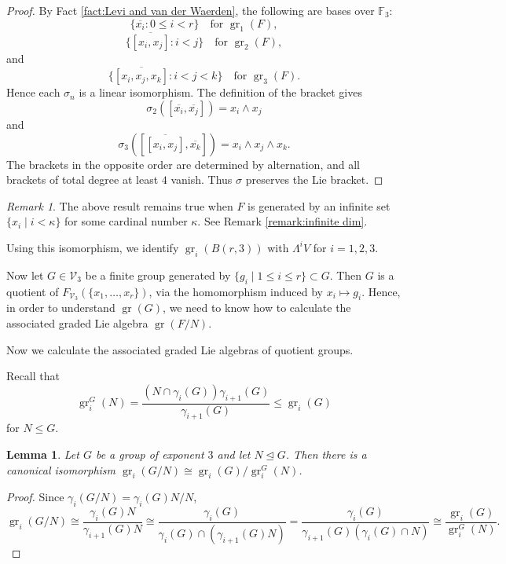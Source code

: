 \documentclass[11pt,reqno]{article}
\newtheorem{lemma}[theorem]{Lemma}
\theoremstyle{definition}
\theoremstyle{remark}
\newtheorem{remark}[theorem]{Remark}
\DeclareMathOperator{\gr}{gr}
\begin{document}
\begin{proof}
    By Fact \ref{fact:Levi and van der Waerden}, the following are bases over
    $\mathbb F_3$:
    $$
    \{\overline{x_i}:0\leq i<r\}\quad\text{for }\gr_1(F),
    $$
    \[
    \{\overline{[x_i,x_j]}:i<j\}\quad\text{for }\gr_2(F),
    \]
    and
    \[
    \{\overline{[x_i,x_j,x_k]}:i<j<k\}\quad\text{for }\gr_3(F).
    \]
    Hence each $\sigma_n$ is a linear isomorphism.  The definition of the
    bracket gives
    \[
    \sigma_2([\overline{x_i},\overline{x_j}])=x_i\wedge x_j
    \]
    and
    \[
    \sigma_3([\overline{[x_i,x_j]},\overline{x_k}])
    =x_i\wedge x_j\wedge x_k.
    \]
    The brackets in the opposite order are determined by alternation, and all
    brackets of total degree at least $4$ vanish.  Thus $\sigma$ preserves the
    Lie bracket.
\end{proof}

\begin{remark}
The above result remains true when $F$ is generated by an infinite set $\{x_i\mid i< \kappa\}$ for some cardinal number $\kappa$. See Remark \ref{remark:infinite dim}. 
\end{remark}

Using this isomorphism, we identify $\gr_i(B(r,3))$ with $\Lambda^iV$ for
$i=1,2,3$.


Now let $G\in \mathcal V_3$ be a finite group generated by $\{g_i\mid 1\leq i\leq r\}\subset G$.
Then $G$ is a quotient of $F_{\mathcal V_3}(\{x_1,\ldots,x_r\})$, via the
homomorphism induced by $x_i\mapsto g_i$.
Hence, in order to understand $\gr(G)$, we need to know how to calculate the associated graded Lie algebra $\gr(F/N)$.

Now we calculate the associated graded Lie algebras of quotient groups.


Recall that
\[
\gr_i^G(N)
=\frac{(N\cap\gamma_i(G))\gamma_{i+1}(G)}{\gamma_{i+1}(G)}
\leq\gr_i(G)
\]
for $N\leq G$.
\begin{lemma}\label{lemma:gr of quotient}
    Let $G$ be a group of exponent $3$ and let $N\trianglelefteq G$.
    Then there is a canonical isomorphism $\gr_i(G/N)\cong \gr_i(G)/\gr_i^G(N)$.
\end{lemma}

\begin{proof}
    Since $\gamma_i(G/N)=\gamma_i(G)N/N$, 
    \[
    \gr_i(G/N)
    \cong
    \frac{\gamma_i(G)N}{\gamma_{i+1}(G)N}
    \cong
    \frac{\gamma_i(G)}{\gamma_{i}(G)\cap(\gamma_{i+1}(G)N)}
    =
    \frac{\gamma_i(G)}{\gamma_{i+1}(G)(\gamma_i(G)\cap N)}
    \cong
    \frac{\gr_i(G)}{\gr_i^G(N)}.
    \]
\end{proof}
\end{document}
